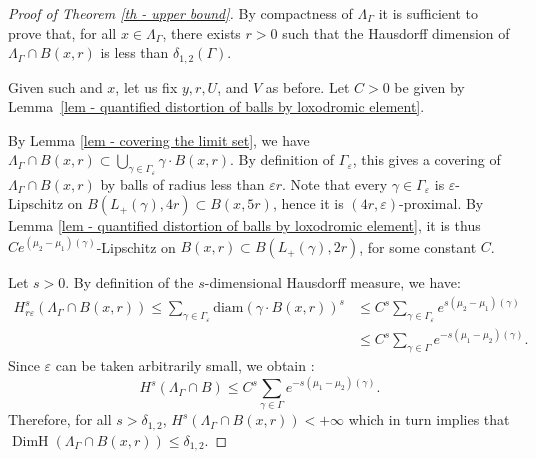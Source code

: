 \documentclass[10pt,a4paper]{article}
\theoremstyle{definition}
\DeclareMathOperator{\DimH}{DimH}
\let\epsilon\varepsilon
\let\G\Gamma
\let\g\gamma
\begin{document}
\begin{proof}[Proof of Theorem \ref{th - upper bound}]
By compactness of $\Lambda_\Gamma$ it is sufficient to prove that, for all $x\in \Lambda_\Gamma$, there exists $r>0$ such that the Hausdorff dimension of $\Lambda_\Gamma \cap B(x,r)$ is less than $ \delta_{1,2}(\G)$.

Given such and $x$, let us fix $y, r, U$, and $V$ as before. Let $C>0$ be given by Lemma~\ref{lem - quantified distortion of balls by loxodromic element}.

By Lemma \ref{lem - covering the limit set}, we have $\Lambda_\Gamma\cap B(x,r) \subset \bigcup_{\g \in \G_\epsilon} \g \cdot B(x,r)$. By definition of $\G_\epsilon$, this gives a covering of $\Lambda_\Gamma\cap B(x,r)$ by balls of radius less than $\epsilon r$.
Note that every $\gamma \in \Gamma_\epsilon$ is $\epsilon$-Lipschitz on $B(L_+(\gamma), 4r) \subset B(x,5r)$, hence it is $(4r,\epsilon)$\nobreakdash-prox\-imal. By Lemma \ref{lem - quantified distortion of balls by loxodromic element}, it is thus $Ce^{(\mu_2-\mu_1)(\gamma)}$-Lipschitz on $B(x,r) \subset B(L_+(\g),2r)$, for some constant $C$.

Let $s>0$. By definition of the $s$-dimensional Hausdorff measure, we have:
\begin{align*}
H^{s}_{r\epsilon} (\Lambda_\Gamma \cap B(x,r))\leq \sum_{\g\in \G_\epsilon} \mathrm{diam}(\g \cdot B(x,r)) ^s
& \leq C^s \sum_{\g\in \G_\epsilon} e^{s(\mu_2- \mu_1)(\g)}\\
&\leq C^s \sum_{\g\in \G} e^{-s(\mu_1- \mu_2) (\g)}.
\end{align*}
Since $\epsilon$ can be taken arbitrarily small, we obtain :
\[H^{s} (\Lambda_\G \cap B)\leq C^s \sum_{\g\in \G} e^{-s(\mu_1- \mu_2) (\g)}.\]
Therefore, for all $s>\delta_{1,2}$,
$H^{s} (\Lambda_\G \cap B(x,r))<+\infty$ which in turn implies that $\DimH(\Lambda_\G\cap B(x,r)) \leq \delta_{1,2}$.
\end{proof}
\end{document}
